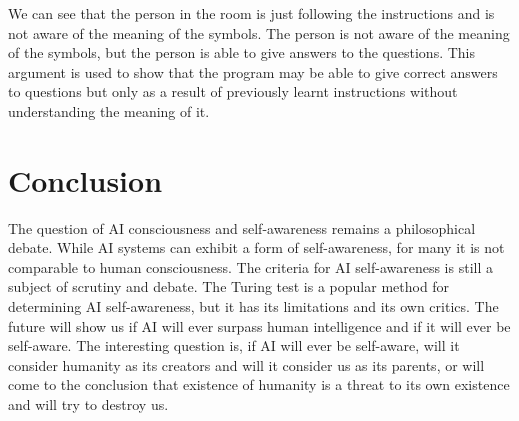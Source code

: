 \documentclass[12pt]{extarticle}
\begin{document}
We can see that the person in the room is just following the instructions and is not aware of the meaning of the symbols.
The person is not aware of the meaning of the symbols, but the person is able to give answers to the questions.
This argument is used to show that the program may be able to give correct answers to questions but only as a result of 
previously learnt instructions without understanding the meaning of it.

\section{Conclusion}
The question of AI consciousness and self-awareness remains a philosophical debate. 
While AI systems can exhibit a form of self-awareness, for many it is not comparable to human consciousness.
The criteria for AI self-awareness is still a subject of scrutiny and debate.
The Turing test is a popular method for determining AI self-awareness, but it has its limitations and its own critics.
The future will show us if AI will ever surpass human intelligence and if it will ever be self-aware.
The interesting question is, if AI will ever be self-aware, will it consider humanity as its creators and will it consider us as its parents,
or will come to the conclusion that existence of humanity is a threat to its own existence and will try to destroy us.

\pagebreak
\end{document}

